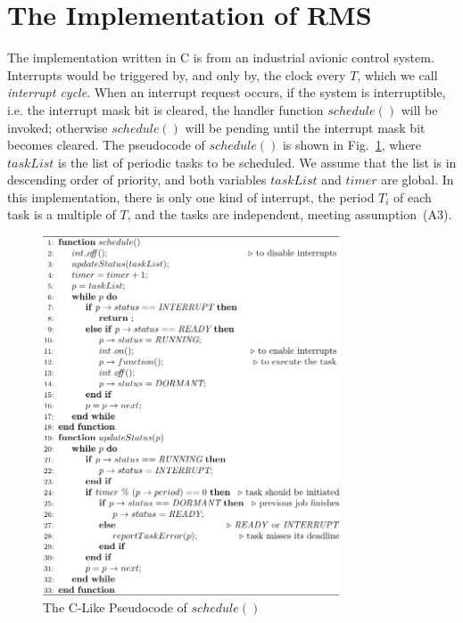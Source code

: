 \documentclass[12pt,onecolumn]{IEEEtranTIE}
\begin{document}
\section{The Implementation of RMS}
\label{s:imp}
The implementation written in C is from an industrial avionic control
system.  Interrupts would be triggered by, and only by, the clock
every $T$, which we call \emph{interrupt cycle}. When an interrupt
request occurs, if the system is interruptible, i.e. the interrupt
mask bit is cleared, the handler function $\mathit{schedule()}$ will
be invoked; otherwise $\mathit{schedule()}$ will be pending until the
interrupt mask bit becomes cleared.  The pseudocode of
$\mathit{schedule()}$ is shown in Fig.~\ref{f:schedule}, where
$\mathit{taskList}$ is the list of periodic tasks to be scheduled. We
assume that the list is in descending order of priority, and both
variables $\mathit{taskList}$ and $\mathit{timer}$ are global. In this
implementation, there is only one kind of interrupt, the period $T_i$
of each task is a multiple of $T$, and the tasks are independent,
meeting assumption~(A3).

\begin{figure}[!t]
\centering
\includegraphics[width=8.8cm]{FIG1_15-TIE-3480.pdf}
\caption{The C-Like Pseudocode of $schedule()$}
\label{f:schedule}
\end{figure}
\end{document}
